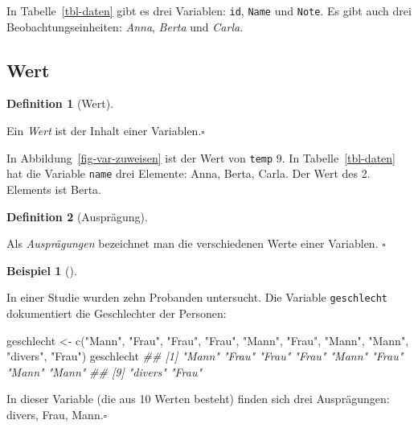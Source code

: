 \documentclass[
  letterpaper,
]{scrbook}
\newenvironment{Shaded}{\begin{snugshade}}{\end{snugshade}}
\newcommand{\DocumentationTok}[1]{\textcolor[rgb]{0.37,0.37,0.37}{\textit{#1}}}
\newcommand{\FunctionTok}[1]{\textcolor[rgb]{0.28,0.35,0.67}{#1}}
\newcommand{\NormalTok}[1]{\textcolor[rgb]{0.00,0.23,0.31}{#1}}
\newcommand{\OtherTok}[1]{\textcolor[rgb]{0.00,0.23,0.31}{#1}}
\newcommand{\StringTok}[1]{\textcolor[rgb]{0.13,0.47,0.30}{#1}}
\theoremstyle{definition}
\newtheorem{example}{Beispiel}[chapter]
\theoremstyle{definition}
\newtheorem{definition}{Definition}[chapter]
\theoremstyle{definition}
\theoremstyle{remark}
\begin{document}
In Tabelle~\ref{tbl-daten} gibt es drei Variablen: \texttt{id},
\texttt{Name} und \texttt{Note}. Es gibt auch drei
Beobachtungseinheiten: \emph{Anna}, \emph{Berta} und \emph{Carla.}

\subsection{Wert}\label{wert}

\begin{definition}[Wert]\protect\hypertarget{def-wert}{}\label{def-wert}

Ein \emph{Wert} ist der Inhalt einer Variablen.\(\square\)

\end{definition}

In Abbildung~\ref{fig-var-zuweisen} ist der Wert von \texttt{temp} 9. In
Tabelle~\ref{tbl-daten} hat die Variable \texttt{name} drei Elemente:
Anna, Berta, Carla. Der Wert des 2. Elements ist Berta.

\begin{definition}[Ausprägung]\protect\hypertarget{def-auspraegung}{}\label{def-auspraegung}

Als \emph{Ausprägungen} bezeichnet man die verschiedenen Werte einer
Variablen. \(\square\)

\end{definition}

\begin{example}[]\protect\hypertarget{exm-geschlecht}{}\label{exm-geschlecht}

In einer Studie wurden zehn Probanden untersucht. Die Variable
\texttt{geschlecht} dokumentiert die Geschlechter der Personen:

\begin{Shaded}
\begin{Highlighting}[]
\NormalTok{geschlecht }\OtherTok{\textless{}{-}} \FunctionTok{c}\NormalTok{(}\StringTok{"Mann"}\NormalTok{, }\StringTok{"Frau"}\NormalTok{, }\StringTok{"Frau"}\NormalTok{, }\StringTok{"Frau"}\NormalTok{, }\StringTok{"Mann"}\NormalTok{,}
                \StringTok{"Frau"}\NormalTok{, }\StringTok{"Mann"}\NormalTok{, }\StringTok{"Mann"}\NormalTok{, }\StringTok{"divers"}\NormalTok{, }\StringTok{"Frau"}\NormalTok{)}
\NormalTok{geschlecht}
\DocumentationTok{\#\#  [1] "Mann"   "Frau"   "Frau"   "Frau"   "Mann"   "Frau"   "Mann"   "Mann"  }
\DocumentationTok{\#\#  [9] "divers" "Frau"}
\end{Highlighting}
\end{Shaded}

In dieser Variable (die aus 10 Werten besteht) finden sich drei
Ausprägungen: divers, Frau, Mann.\(\square\)

\end{example}
\end{document}
